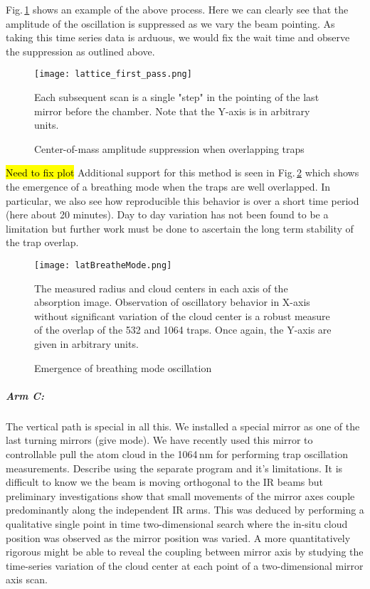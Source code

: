 Fig.\,\ref{fig:latFirtPass} shows an example of the above process.
Here we can clearly see that the amplitude of the oscillation is suppressed as we vary the beam pointing.
As taking this time series data is arduous, we would fix the wait time and observe the suppression as outlined above.
	\begin{figure} 
		\centerline{
		\texttt{[image: lattice\_first\_pass.png]}}
		\caption{Center-of-mass amplitude suppression when overlapping traps}{Each subsequent scan is a single "step" in the pointing of the last mirror before the chamber. Note that the Y-axis is in arbitrary units.}
		\label{fig:latFirtPass}
	\end{figure}
	
\hl{Need to fix plot} Additional support for this method is seen in Fig.\,\ref{fig:latBreatheMode} which shows the emergence of a breathing mode when the traps are well overlapped.
In particular, we also see how reproducible this behavior is over a short time period (here about 20 minutes).
Day to day variation has not been found to be a limitation but further work must be done to ascertain the long term stability of the trap overlap.
	\begin{figure} 
		\centerline{
		\texttt{[image: latBreatheMode.png]}}
		\caption{Emergence of breathing mode oscillation}{The measured radius and cloud centers in each axis of the absorption image. Observation of oscillatory behavior in X-axis without significant variation of the cloud center is a robust measure of the overlap of the 532 and 1064 traps. Once again, the Y-axis are given in arbitrary units.}
		\label{fig:latBreatheMode}
	\end{figure}
	
\subparagraph{Arm C:} \label{p:armCFirstPas}
The vertical path is special in all this.
We installed a special mirror as one of the last turning mirrors (give mode).
We have recently used this mirror to controllable pull the atom cloud in the 1064\,nm for performing trap oscillation measurements.
Describe using the separate program and it's limitations.
It is difficult to know we the beam is moving orthogonal to the IR beams but preliminary investigations show that small movements of the mirror axes couple predominantly along the independent IR arms.
This was deduced by performing a qualitative single point in time two-dimensional search where the in-situ cloud position was observed as the mirror position was varied.
A more quantitatively rigorous might be able to reveal the coupling between mirror axis by studying the time-series variation of the cloud center at each point of a two-dimensional mirror axis scan.


